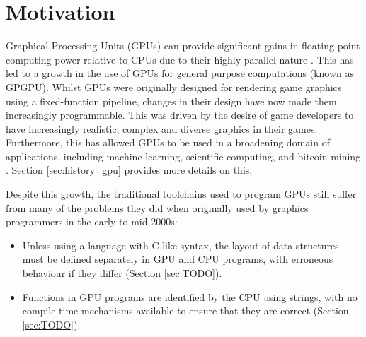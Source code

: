 \documentclass[a4paper,12pt,twoside,openright]{report}
\begin{document}
\section{Motivation}




\label{sec:motivation}

Graphical Processing Units (GPUs) can provide significant gains in
floating-point computing power relative to CPUs due to their highly parallel
nature \cite{CPUGPUOverTime}. This has led to a growth in the use of GPUs for
general purpose computations (known as GPGPU). Whilst GPUs were originally
designed for rendering game graphics using a fixed-function pipeline, changes
in their design have now made them increasingly programmable. This was driven
by the desire of game developers to have increasingly realistic, complex and
diverse graphics in their games. Furthermore, this has allowed GPUs to be used
in a broadening domain of applications, including machine learning, scientific
computing, and bitcoin mining \cite{GPUCrypto} \cite{GPUScientificComputing}
\cite{GPUAI}. Section \ref{sec:history_gpu} provides more details on this.


Despite this growth, the traditional toolchains used to program GPUs still
suffer from many of the problems they did when originally used by graphics
programmers in the early-to-mid 2000s:

\begin{itemize}

    \item Unless using a language with C-like syntax, the layout of data
    structures must be defined separately in GPU and CPU programs, with
    erroneous behaviour if they differ (Section \ref{sec:TODO}).

    \item Functions in GPU programs are identified by the CPU using strings,
    with no compile-time mechanisms available to ensure that they are correct
    (Section \ref{sec:TODO}).


\end{itemize}
\end{document}
